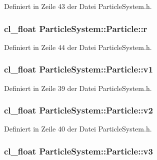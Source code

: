 Definiert in Zeile 43 der Datei Particle\-System.\-h.

\hypertarget{structParticleSystem_1_1Particle_af7eeeaeadb028ec9bf674555b32a05c6}{
\subsubsection[{r}]{\setlength{\rightskip}{0pt plus 5cm}cl\-\_\-float Particle\-System\-::\-Particle\-::r}}\label{structParticleSystem_1_1Particle_af7eeeaeadb028ec9bf674555b32a05c6}


Definiert in Zeile 44 der Datei Particle\-System.\-h.

\hypertarget{structParticleSystem_1_1Particle_af42f91c94f6dc6f9712d44e4ddfbbcd6}{
\subsubsection[{v1}]{\setlength{\rightskip}{0pt plus 5cm}cl\-\_\-float Particle\-System\-::\-Particle\-::v1}}\label{structParticleSystem_1_1Particle_af42f91c94f6dc6f9712d44e4ddfbbcd6}


Definiert in Zeile 39 der Datei Particle\-System.\-h.

\hypertarget{structParticleSystem_1_1Particle_ae224141da533bb0fc6651174a0847254}{
\subsubsection[{v2}]{\setlength{\rightskip}{0pt plus 5cm}cl\-\_\-float Particle\-System\-::\-Particle\-::v2}}\label{structParticleSystem_1_1Particle_ae224141da533bb0fc6651174a0847254}


Definiert in Zeile 40 der Datei Particle\-System.\-h.

\hypertarget{structParticleSystem_1_1Particle_adcd4e75569b0d8eb614cc8d393ef7e7d}{
\subsubsection[{v3}]{\setlength{\rightskip}{0pt plus 5cm}cl\-\_\-float Particle\-System\-::\-Particle\-::v3}}\label{structParticleSystem_1_1Particle_adcd4e75569b0d8eb614cc8d393ef7e7d}


